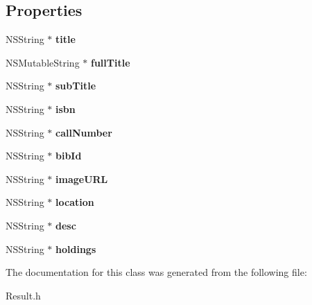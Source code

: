 \subsection*{Properties}
\begin{DoxyCompactItemize}
\item 
N\+S\+String $\ast$ {\bfseries title}\label{interface_result_a221a82d22ef456d6a35cf6d74802b262}

\item 
N\+S\+Mutable\+String $\ast$ {\bfseries full\+Title}\label{interface_result_ae0ee8bca9a5152da9dadaaa6e87df815}

\item 
N\+S\+String $\ast$ {\bfseries sub\+Title}\label{interface_result_a4762f86f65f843c100a26838b8b901d4}

\item 
N\+S\+String $\ast$ {\bfseries isbn}\label{interface_result_a986030e775d3d57737a1cbdd08415efc}

\item 
N\+S\+String $\ast$ {\bfseries call\+Number}\label{interface_result_a5e884192413fb61453b6157c61580d37}

\item 
N\+S\+String $\ast$ {\bfseries bib\+Id}\label{interface_result_a5954ccfa6df362fda75ec5f276d2f16d}

\item 
N\+S\+String $\ast$ {\bfseries image\+U\+R\+L}\label{interface_result_a0b86d59eecde1e63af6212fe878c9c2e}

\item 
N\+S\+String $\ast$ {\bfseries location}\label{interface_result_af3b3c099477d3b115685206a8431aae2}

\item 
N\+S\+String $\ast$ {\bfseries desc}\label{interface_result_ac14c9c42e2ab672d0ec95253f47f9a6b}

\item 
N\+S\+String $\ast$ {\bfseries holdings}\label{interface_result_a3cd81c370679552c64e3a5f32c0fef47}

\end{DoxyCompactItemize}


The documentation for this class was generated from the following file\+:\begin{DoxyCompactItemize}
\item 
Result.\+h\end{DoxyCompactItemize}
